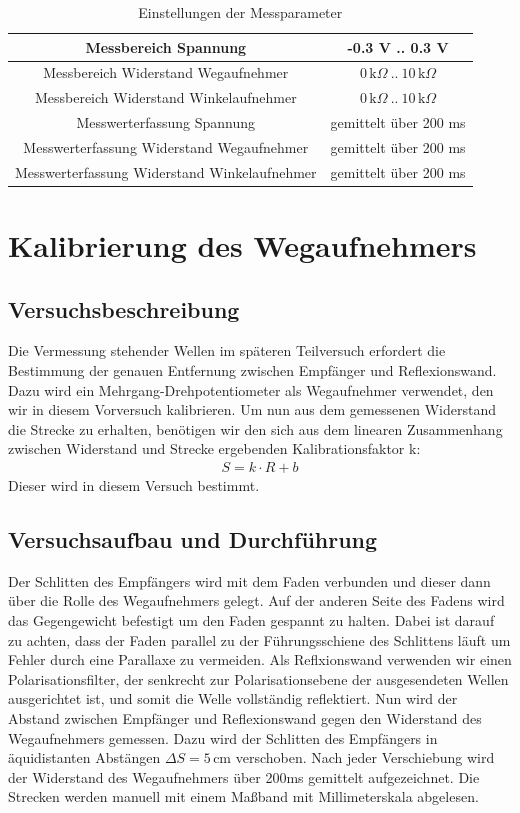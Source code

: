 \documentclass[12pt,a4paper]{article}
\begin{document}
\begin{table}[H]
	\centering
	\begin{tabular}{|c|c|}
		\hline 
		Messbereich Spannung  & -0.3 V .. 0.3 V \\ 
		\hline 
		Messbereich Widerstand Wegaufnehmer & $0\,\text{k}\Omega\ ..\ 10\,\text{k}\Omega$\\ 
		\hline 
		Messbereich Widerstand Winkelaufnehmer & $0\,\text{k}\Omega\ ..\ 10\,\text{k}\Omega$\\
		\hline
		Messwerterfassung Spannung & gemittelt über 200 ms \\ 
		\hline 
		Messwerterfassung Widerstand Wegaufnehmer & gemittelt über 200 ms \\ 
		\hline 
		Messwerterfassung Widerstand Winkelaufnehmer & gemittelt über 200 ms \\ 
		\hline
	\end{tabular} 
	\caption{Einstellungen der Messparameter}
	\label{tab:MessparameterAllgemein}
\end{table}
\newpage
\section{Kalibrierung des Wegaufnehmers}
\subsection{Versuchsbeschreibung}
Die Vermessung stehender Wellen im späteren Teilversuch erfordert die Bestimmung der genauen Entfernung zwischen Empfänger und Reflexionswand. Dazu wird ein Mehrgang-Drehpotentiometer als Wegaufnehmer verwendet, den wir in diesem Vorversuch kalibrieren.
Um nun aus dem gemessenen Widerstand die Strecke zu erhalten, benötigen wir den sich aus dem linearen Zusammenhang zwischen Widerstand und Strecke ergebenden Kalibrationsfaktor k:
\begin{align*}
S = k \cdot R + b
\end{align*}
Dieser wird in diesem Versuch bestimmt.
\subsection{Versuchsaufbau und Durchführung}
Der Schlitten des Empfängers wird mit dem Faden verbunden und dieser dann über die Rolle des Wegaufnehmers gelegt. Auf der anderen Seite des Fadens wird das Gegengewicht befestigt um den Faden gespannt zu halten. Dabei ist darauf zu achten, dass der Faden parallel zu der Führungsschiene des Schlittens läuft um Fehler durch eine Parallaxe zu vermeiden. Als Reflxionswand verwenden wir einen Polarisationsfilter, der senkrecht zur Polarisationsebene der ausgesendeten Wellen ausgerichtet ist, und somit die Welle vollständig reflektiert. \newline
Nun wird der Abstand zwischen Empfänger und Reflexionswand gegen den Widerstand des Wegaufnehmers gemessen. Dazu wird der Schlitten des Empfängers in äquidistanten Abstängen $\Delta S = 5\,\text{cm}$ verschoben. Nach jeder Verschiebung wird der Widerstand des Wegaufnehmers über 200ms gemittelt aufgezeichnet. Die Strecken werden manuell mit einem Maßband mit Millimeterskala abgelesen. 
\end{document}
